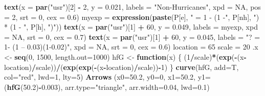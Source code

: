 \documentclass[12pt,twoside]{reedthesis}
\newenvironment{Shaded}{\begin{snugshade}}{\end{snugshade}}
\newcommand{\ControlFlowTok}[1]{\textcolor[rgb]{0.13,0.29,0.53}{\textbf{#1}}}
\newcommand{\DataTypeTok}[1]{\textcolor[rgb]{0.13,0.29,0.53}{#1}}
\newcommand{\DecValTok}[1]{\textcolor[rgb]{0.00,0.00,0.81}{#1}}
\newcommand{\FloatTok}[1]{\textcolor[rgb]{0.00,0.00,0.81}{#1}}
\newcommand{\KeywordTok}[1]{\textcolor[rgb]{0.13,0.29,0.53}{\textbf{#1}}}
\newcommand{\NormalTok}[1]{#1}
\newcommand{\OperatorTok}[1]{\textcolor[rgb]{0.81,0.36,0.00}{\textbf{#1}}}
\newcommand{\OtherTok}[1]{\textcolor[rgb]{0.56,0.35,0.01}{#1}}
\newcommand{\StringTok}[1]{\textcolor[rgb]{0.31,0.60,0.02}{#1}}
\begin{document}
\begin{Shaded}
\begin{Highlighting}[]
  \KeywordTok{text}\NormalTok{(}\DataTypeTok{x =} \KeywordTok{par}\NormalTok{(}\StringTok{"usr"}\NormalTok{)[}\DecValTok{2}\NormalTok{] }\OperatorTok{-}\StringTok{ }\DecValTok{2}\NormalTok{,  }\DataTypeTok{y =} \FloatTok{0.021}\NormalTok{, }\DataTypeTok{labels =} \StringTok{"Non-Hurricanes"}\NormalTok{, }\DataTypeTok{xpd =} \OtherTok{NA}\NormalTok{, }\DataTypeTok{pos =} \DecValTok{2}\NormalTok{, }\DataTypeTok{srt =} \DecValTok{0}\NormalTok{, }\DataTypeTok{cex =} \FloatTok{0.6}\NormalTok{)}
\NormalTok{  myexp =}\StringTok{ }\KeywordTok{expression}\NormalTok{(}\KeywordTok{paste}\NormalTok{(P[e], }\StringTok{" = 1 - (1 -"}\NormalTok{, P[nh], }\StringTok{") * (1 - "}\NormalTok{, P[h], }\StringTok{")"}\NormalTok{))}
  \KeywordTok{text}\NormalTok{(}\DataTypeTok{x =} \KeywordTok{par}\NormalTok{(}\StringTok{"usr"}\NormalTok{)[}\DecValTok{1}\NormalTok{] }\OperatorTok{+}\StringTok{ }\DecValTok{60}\NormalTok{,  }\DataTypeTok{y =} \FloatTok{0.049}\NormalTok{, }\DataTypeTok{labels =}\NormalTok{ myexp, }\DataTypeTok{xpd =} \OtherTok{NA}\NormalTok{, }\DataTypeTok{srt =} \DecValTok{0}\NormalTok{, }\DataTypeTok{cex =} \FloatTok{0.7}\NormalTok{)}
  \KeywordTok{text}\NormalTok{(}\DataTypeTok{x =} \KeywordTok{par}\NormalTok{(}\StringTok{"usr"}\NormalTok{)[}\DecValTok{1}\NormalTok{] }\OperatorTok{+}\StringTok{ }\DecValTok{60}\NormalTok{,  }\DataTypeTok{y =} \FloatTok{0.045}\NormalTok{, }\DataTypeTok{labels =} \StringTok{"? = 1- (1 – 0.03)(1-0.02)"}\NormalTok{, }\DataTypeTok{xpd =} \OtherTok{NA}\NormalTok{, }\DataTypeTok{srt =} \DecValTok{0}\NormalTok{, }\DataTypeTok{cex =} \FloatTok{0.6}\NormalTok{)}
\NormalTok{  location =}\StringTok{ }\DecValTok{65}
\NormalTok{  scale =}\StringTok{ }\DecValTok{20}
\NormalTok{  .x <-}\StringTok{ }\KeywordTok{seq}\NormalTok{(}\DecValTok{0}\NormalTok{, }\DecValTok{1500}\NormalTok{, }\DataTypeTok{length.out=}\DecValTok{1000}\NormalTok{)}
\NormalTok{  hfG <-}\StringTok{ }\ControlFlowTok{function}\NormalTok{(x) \{}
\NormalTok{    (}\DecValTok{1}\OperatorTok{/}\NormalTok{scale)}\OperatorTok{*}\NormalTok{(}\KeywordTok{exp}\NormalTok{(}\OperatorTok{-}\NormalTok{(x}\OperatorTok{-}\NormalTok{location)}\OperatorTok{/}\NormalTok{scale))}\OperatorTok{/}\NormalTok{(}\KeywordTok{exp}\NormalTok{(}\KeywordTok{exp}\NormalTok{(}\OperatorTok{-}\NormalTok{(x}\OperatorTok{-}\NormalTok{location)}\OperatorTok{/}\NormalTok{scale))}\OperatorTok{-}\DecValTok{1}\NormalTok{)}
\NormalTok{  \}}
  \KeywordTok{curve}\NormalTok{(hfG, }\DataTypeTok{add=}\NormalTok{T, }\DataTypeTok{col=}\StringTok{"red"}\NormalTok{, }\DataTypeTok{lwd=}\DecValTok{1}\NormalTok{, }\DataTypeTok{lty=}\DecValTok{5}\NormalTok{)}
  \KeywordTok{Arrows}\NormalTok{ (}\DataTypeTok{x0=}\FloatTok{50.2}\NormalTok{, }\DataTypeTok{y0=}\DecValTok{0}\NormalTok{, }\DataTypeTok{x1=}\FloatTok{50.2}\NormalTok{, }\DataTypeTok{y1=}\NormalTok{(}\KeywordTok{hfG}\NormalTok{(}\FloatTok{50.2}\NormalTok{)}\OperatorTok{-}\FloatTok{0.003}\NormalTok{), }\DataTypeTok{arr.type=}\StringTok{"triangle"}\NormalTok{, }\DataTypeTok{arr.width=}\FloatTok{0.04}\NormalTok{, }\DataTypeTok{lwd=}\FloatTok{0.1}\NormalTok{)}
  

\end{Highlighting}
\end{Shaded}
\end{document}
